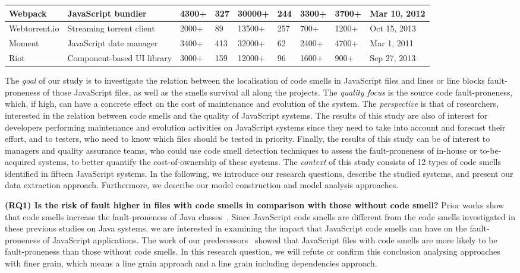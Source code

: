 \begin{table*}[!htbp]
\begin{tabular}{l|l|l|l|l|l|l|l|l}
Webpack	 & JavaScript bundler		& 4300+		 & 327			   & 30000+			 & 244 		   & 3300+			  & 3700+	 & Mar 10, 2012 		   \\ \hline
Webtorrent.io & Streaming torrent client & 2000+	 & 89			   & 13500+			 & 257		   & 700+			  & 1200+	 & Oct 15, 2013		   \\ \hline
Moment	 & JavaScript date manager  & 3400+		 & 413			   & 32000+			 & 62		   & 2400+			  & 4700+ 	 & Mar 1, 2011			   \\ \hline
Riot	 & Component-based UI library & 3000+ 	 & 159			   & 12000+			 & 96 		   & 1600+			  & 900+	 & Sep 27, 2013		   \\ \hline
\end{tabular}
\vspace{-15pt}
\end{table*}

The \emph{goal} of our study is to investigate the relation between the {\color{blue}localisation} of code smells in JavaScript files and {\color{blue}lines or line blocks} fault-proneness {\color{blue}of those JavaScript files}, as well as the smells survival all along the projects. The \emph{quality focus} is the source code fault-proneness, which, if high, can have a concrete effect on the cost of maintenance and evolution of the system. The \emph{perspective} is that of researchers, interested in the relation between code smells and the quality of JavaScript systems. The results of this study are also of interest for developers performing maintenance and evolution activities on JavaScript systems since they need to take
into account and forecast their effort, and to testers, who need to know which files should be tested in priority. Finally, the results of this study can be of interest to managers and quality assurance teams, who could use code smell detection techniques to assess the fault-proneness of in-house or to-be-acquired systems, to better quantify
the cost-of-ownership of these systems. The \emph{context} of this study consists of 12 types of code smells identified in {\color{blue}fifteen} JavaScript systems. In the following, we introduce our research questions, describe the studied systems, and present our data extraction approach. Furthermore, we describe our model construction and model analysis approaches.

\textbf{(RQ1) Is the risk of fault higher in files with code smells in comparison with those without code smell?}
Prior works show that code smells increase the fault-proneness of Java classes~\cite{Khomh2012,jaafar2013mining}. Since JavaScript code smells are different from the code smells investigated in these previous studies on Java systems, we are interested in examining the impact that JavaScript code smells can have on the fault-proneness of JavaScript applications. {\color{blue}The work of our predecessors~\cite{saboury2017empirical} showed that JavaScript files with code smells are more likely to be fault-proneness than those without code smells. In this research question, we will refute or confirm this conclusion analysing approaches with finer grain, which means a line grain approach and a line grain including dependencies approach.}

